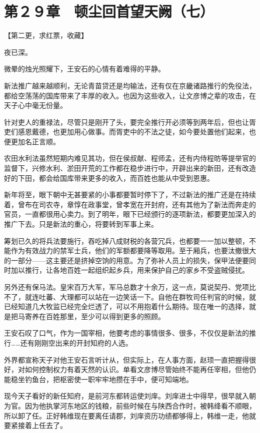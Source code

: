 \section{第２９章　顿尘回首望天阙（七）}

【第二更，求红票，收藏】

夜已深。

微晕的烛光照耀下，王安石的心情有着难得的平静。

新法推广越来越顺利，无论青苗贷还是均输法，还有仅在京畿诸路推行的免役法，都给空荡荡的国库带来了丰厚的收入。也因为这些收入，让文彦博之辈的攻击，在天子心中毫无份量。

针对吏人的重禄法，尽管只是刚开了头，要完全推行开必须等到两年后，但也让胥吏们感恩戴德，也更加用心做事。而胥吏中的不法之徒，如今要处置他们起来，也便更加名正言顺。

农田水利法虽然短期内难见其功，但在侯叔献、程师孟，还有内侍程昉等提举官的监督下，兴修水利、淤田开荒的工作都在稳步进行中，开辟出来的新田，还有改造好的下田，都会给国库带来更多的收入，而百姓也能从中受到恩惠。

新年将至，眼下朝中无甚要紧的小事都要暂时停下了，不过新法的推广还是在持续着，曾布在司农寺，章惇在政事堂，曾孝宽在开封府，还有其他为了新法而奔走的官员，一直都很用心卖力。到了明年，眼下已经颁行的逐项新法，都要更加深入的推广下去。只是新法的重心，将要转到军事上来。

筹划已久的将兵法要施行，吞吃掉八成财税的各营冗兵，也都要一一加以整顿，不能作为有效战力的禁军士兵，他们的军额都要降等取用。至于厢兵，也要汰撤很大的一部分——这主要还是挤掉空饷的用意。为了弥补人员上的损失，保甲法便要同时加以推行，让各地百姓一起组织起乡兵，用来保护自己的家乡不受盗贼侵扰。

另外还有保马法。皇宋百万大军，军马总数才十余万，这一点，莫说契丹、党项比不了，就连吐蕃、大理都可以站在一边笑话一下。自他在群牧司任判官的时候，就已经知道几大牧监已经完全烂透了，可以不用抱着什么期待。现在唯一的选择，就是把马寄养在百姓那里，至少可以得到更多的照顾。

王安石叹了口气，作为一国宰相，他要考虑的事情很多、很多，不仅仅是新法的推行……还有刚刚空出来的开封知府的人选。

外界都宣称天子对他王安石言听计从，但实际上，在人事方面，赵顼一直把握得很好，对如何控制权力有着天然的认识。单看文彦博尽管始终不能再任宰相，但他仍能稳坐钓鱼台，把枢密使一职牢牢地攒在手中，便可知端地。

现今天子看好的新任知府，是前河东都转运使刘庠。刘庠进士中得早，很早就入朝为官。因为他执掌河东地区的钱粮，前些时候在与陕西合作时，被韩绛看不顺眼，所以卸了任。正好韩维现在要离任请郡，刘庠资历功绩都够得上，韩维一走，他就要紧接着上任去了。


